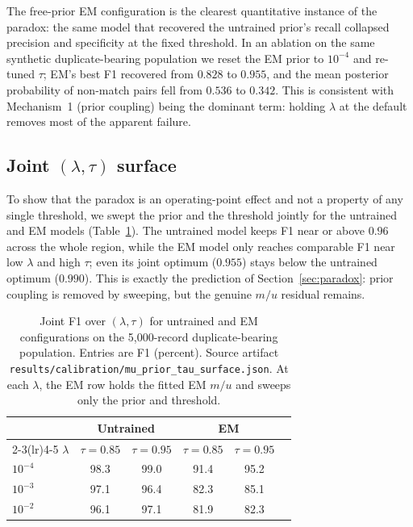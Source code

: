 \documentclass[11pt]{article}
\begin{document}
The free-prior EM configuration is the clearest quantitative instance of the paradox: the
same model that recovered the untrained prior's recall collapsed precision and specificity
at the fixed threshold. In an ablation on the same synthetic duplicate-bearing population we
reset the EM prior to $10^{-4}$ and re-tuned $\tau$; EM's best F1 recovered from $0.828$ to
$0.955$, and the mean posterior probability of non-match pairs fell from $0.536$ to
$0.342$. This is consistent with Mechanism~1 (prior coupling) being the dominant term:
holding $\lambda$ at the default removes most of the apparent failure.

\subsection{Joint $(\lambda,\tau)$ surface}
To show that the paradox is an operating-point effect and not a property of any single
threshold, we swept the prior and the threshold jointly for the untrained and EM models
(Table~\ref{tab:surface}). The untrained model keeps F1 near or above $0.96$ across the whole region, while the EM
model only reaches comparable F1 near low $\lambda$ and high $\tau$; even its joint optimum
($0.955$) stays below the untrained optimum ($0.990$). This is exactly the
prediction of Section~\ref{sec:paradox}: prior coupling is removed by sweeping, but the
genuine $m/u$ residual remains.

\begin{table}[h]
\centering
\caption{Joint F1 over $(\lambda,\tau)$ for untrained and EM configurations on the
5{,}000-record duplicate-bearing population. Entries are F1 (percent). Source artifact
\texttt{results/calibration/mu\_prior\_tau\_surface.json}. At each $\lambda$, the EM row
holds the fitted EM $m/u$ and sweeps only the prior and threshold.}
\label{tab:surface}
\begin{tabular}{lccccc}
\toprule
 & \multicolumn{2}{c}{Untrained} & \multicolumn{2}{c}{EM} & \\
\cmidrule(lr){2-3}\cmidrule(lr){4-5}
$\lambda$ & $\tau=0.85$ & $\tau=0.95$ & $\tau=0.85$ & $\tau=0.95$ &\\
\midrule
$10^{-4}$ & 98.3 & 99.0 & 91.4 & 95.2 &\\
$10^{-3}$ & 97.1 & 96.4 & 82.3 & 85.1 &\\
$10^{-2}$ & 96.1 & 97.1 & 81.9 & 82.3 &\\
\bottomrule
\end{tabular}
\end{table}
\end{document}
